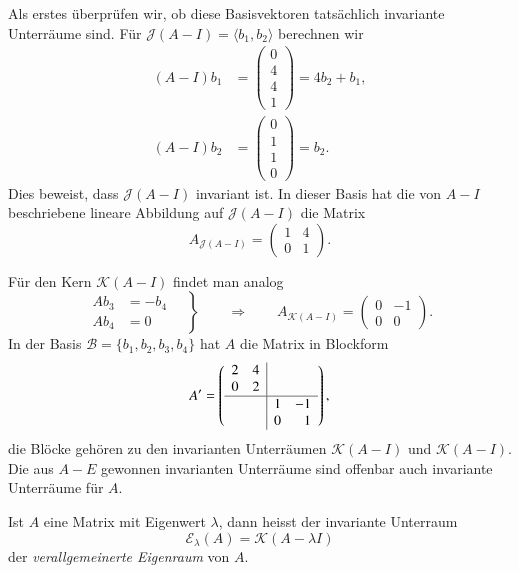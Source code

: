 \begin{beispiel}
Als erstes überprüfen wir, ob diese Basisvektoren tatsächlich invariante
Unterräume sind.
Für $\mathcal{J}(A-I) = \langle b_1,b_2\rangle$
berechnen wir
\begin{align*}
(A-I)b_1
&=
\begin{pmatrix} 0\\4\\4\\1 \end{pmatrix}
=
4b_2+b_1,
\\
(A-I)b_2
&=
\begin{pmatrix} 0\\1\\1\\0 \end{pmatrix}
=
b_2.
\end{align*}
Dies beweist, dass $\mathcal{J}(A-I)$ invariant ist.
In dieser Basis hat die von $A-I$ beschriebene lineare Abbildung
auf $\mathcal{J}(A-I)$ die Matrix
\[
A_{\mathcal{J}(A-I)}
=
\begin{pmatrix}
1&4\\
0&1
\end{pmatrix}.
\]

Für den Kern $\mathcal{K}(A-I)$ findet man analog
\[
\left.
\begin{aligned}
Ab_3
&=
-b_4
\\
Ab_4
&=0
\end{aligned}
\quad\right\}
\qquad\Rightarrow\qquad
A_{\mathcal{K}(A-I)}
=
\begin{pmatrix}
0&-1\\
0& 0
\end{pmatrix}.
\]
In der Basis $\mathcal{B}=\{b_1,b_2,b_3,b_4\}$ hat $A$ die Matrix
in Blockform
\[
A'
=
\left(
\begin{array}{cc|cr}
2&4& & \\
0&2& & \\
\hline
 & &1&-1\\
 & &0& 1
\end{array}\right),
\]
die Blöcke gehören zu den invarianten Unterräumen $\mathcal{K}(A-I)$
und $\mathcal{K}(A-I)$.
Die aus $A-E$ gewonnen invarianten Unterräume sind offenbar auch invariante
Unterräume für $A$.
\end{beispiel}

\begin{definition}
Ist $A$ eine Matrix mit Eigenwert $\lambda$, dann heisst der invariante
Unterraum
\[
\mathcal{E}_{\lambda}(A)
=
\mathcal{K}(A-\lambda I)
\]
der {\em verallgemeinerte Eigenraum} von $A$.
%
%
\end{definition}


